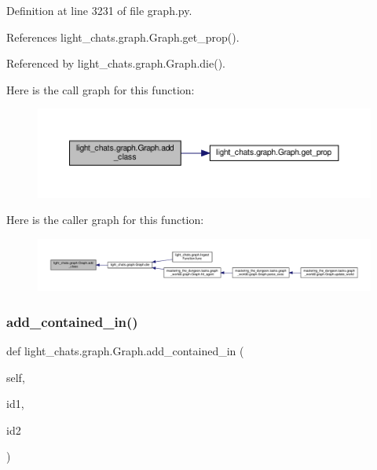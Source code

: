 Definition at line 3231 of file graph.\+py.



References light\+\_\+chats.\+graph.\+Graph.\+get\+\_\+prop().



Referenced by light\+\_\+chats.\+graph.\+Graph.\+die().

Here is the call graph for this function\+:
\nopagebreak
\begin{figure}[H]
\begin{center}
\leavevmode
\includegraphics[width=350pt]{classlight__chats_1_1graph_1_1Graph_acb4a884cb1259a506399e8d1eb7a2f33_cgraph}
\end{center}
\end{figure}
Here is the caller graph for this function\+:
\nopagebreak
\begin{figure}[H]
\begin{center}
\leavevmode
\includegraphics[width=350pt]{classlight__chats_1_1graph_1_1Graph_acb4a884cb1259a506399e8d1eb7a2f33_icgraph}
\end{center}
\end{figure}
\mbox{\label{classlight__chats_1_1graph_1_1Graph_a764ec9d5d95e071d857644b1947a2385}} 
\subsubsection{\texorpdfstring{add\+\_\+contained\+\_\+in()}{add\_contained\_in()}}
{\footnotesize\ttfamily def light\+\_\+chats.\+graph.\+Graph.\+add\+\_\+contained\+\_\+in (\begin{DoxyParamCaption}\item[{}]{self,  }\item[{}]{id1,  }\item[{}]{id2 }\end{DoxyParamCaption})}



